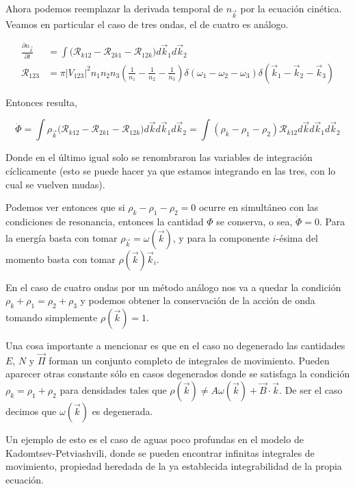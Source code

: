 Ahora podemos reemplazar la derivada temporal de $n_{\vec k}$ por la ecuación cinética. Veamos en particular el caso de tres ondas, el de cuatro es análogo.

\begin{align}
	\frac{\partial n_{\vec k}}{\partial t} &= \int \big(\mathcal{R}_{k12} -\mathcal{R}_{2k1} - \mathcal{R}_{12k}\big) d\vec k_1 d\vec k_2 \\
	\mathcal{R}_{123} &= \pi |V_{123}|^2 n_1n_2n_3\left(\frac{1}{n_1}-\frac{1}{n_2}-\frac{1}{n_3}\right)\delta(\omega_1-\omega_2-\omega_3)\delta(\vec k_1 -\vec k_2-\vec k_3)
\end{align}

Entonces resulta,

\begin{equation}
	\dot \Phi = \int \rho_{\vec k}  \big(\mathcal{R}_{k12} -\mathcal{R}_{2k1} - \mathcal{R}_{12k}\big)    d\vec  k d\vec k_1 d\vec k_2 = \int (\rho_k-\rho_1 -\rho_2) \mathcal{R}_{k12} d\vec k d\vec k_1 d\vec k_2
\end{equation}

Donde en el último igual solo se renombraron las variables de integración cíclicamente (esto se puede hacer ya que estamos integrando en las tres, con lo cual se vuelven mudas).

Podemos ver entonces que si $\rho_k-\rho_1-\rho_2=0$ ocurre en simultáneo con las condiciones de resonancia, entonces la cantidad $\Phi$ se conserva, o sea, $\dot\Phi=0$. Para la energía basta con tomar $\rho_{\vec k}=\omega(\vec k)$, y para la componente $i$-ésima del momento basta con tomar $\rho(\vec k)\vec k_i$. 

En el caso de cuatro ondas por un método análogo nos va a quedar la condición $\rho_k+\rho_1=\rho_2+\rho_3$ y podemos obtener la conservación de la acción de onda tomando simplemente $\rho(\vec k)=1$. 

Una cosa importante a mencionar es que en el caso no degenerado las cantidades $E$, $N$ y $\vec \Pi$ forman un conjunto completo de integrales de movimiento. Pueden aparecer otras constante sólo en casos degenerados \cite{zakharovKolmogorovSpectraTurbulence1992} donde se satisfaga la condición $\rho_k=\rho_1+\rho_2$ para densidades tales que $\rho(\vec k)\neq A\omega(\vec k)+\vec B\cdot\vec k$. De ser el caso decimos que $\omega(\vec k)$ es degenerada.

Un ejemplo de esto es el caso de aguas poco profundas en el modelo de Kadomtsev-Petviashvili, donde se pueden encontrar infinitas integrales de movimiento, propiedad heredada de la ya establecida integrabilidad de la propia ecuación.

